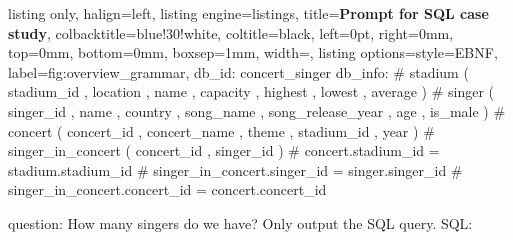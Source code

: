     \begin{tcblisting}{
        listing only, 
        halign=left,
        listing engine=listings,
        title=\textbf{\small Prompt for SQL case study},
        colbacktitle=blue!30!white, 
        coltitle=black,
        left=0pt,               %
        right=0mm,              %
        top=0mm,                %
        bottom=0mm,             %
        boxsep=1mm,
        width=\textwidth,
        listing options={style=EBNF},
        label={fig:overview_grammar},
    }
    db_id: concert_singer
    db_info: # stadium ( stadium_id , location , name , capacity , highest , lowest , average )
    # singer ( singer_id , name , country , song_name , song_release_year , age , is_male )
    # concert ( concert_id , concert_name , theme , stadium_id , year )
    # singer_in_concert ( concert_id , singer_id )
    # concert.stadium_id = stadium.stadium_id
    # singer_in_concert.singer_id = singer.singer_id
    # singer_in_concert.concert_id = concert.concert_id

    question: How many singers do we have? Only output the SQL query. 
    SQL:
    \end{tcblisting}
    \label{fig:database_schema_query}
